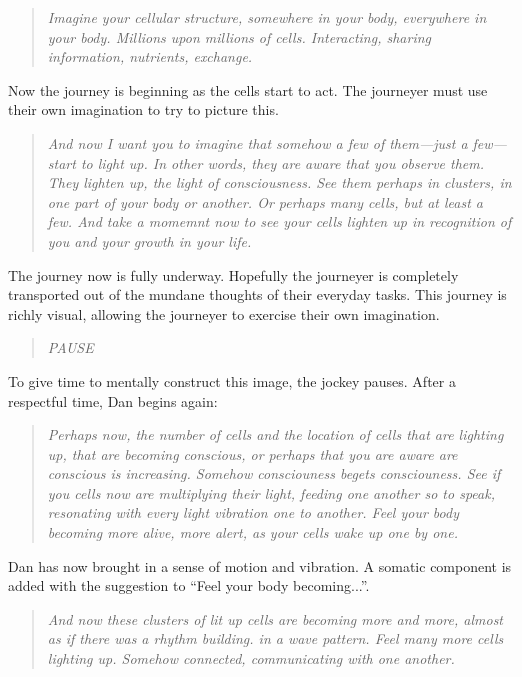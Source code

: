 \documentclass[12pt]{book}
\begin{document}
\begin{quote}{\em
Imagine your cellular structure, somewhere in your body, everywhere in your body.
Millions upon millions of cells. Interacting, sharing information, nutrients,
exchange.
}\end{quote}
Now the journey is beginning as the cells start to act. The journeyer
must use their own imagination to try to picture this.

\begin{quote}{\em
And now I want you to imagine that somehow a few of them---just a few---start to light up.
In other words, they are aware that you observe them.
They lighten up, the light of consciousness.
See them perhaps in clusters, in one part of your body or another.
Or perhaps many cells, but at least a few. And take a momemnt now
to see your cells lighten up in recognition of you and your growth in
your life.
}\end{quote}

The journey now is fully underway. Hopefully the journeyer is completely
transported out of the mundane thoughts of their everyday tasks. This
journey is richly visual, allowing the journeyer to exercise their
own imagination.

\begin{quote}{\em
  PAUSE
}\end{quote}

To give time to mentally construct this image, the jockey pauses.
After a respectful time, Dan begins again:

\begin{quote}{\em
Perhaps now, the number of cells and the location of cells that are lighting
up, that are becoming conscious, or perhaps that you are aware are conscious
is increasing. Somehow consciouness begets consciouness. See if you cells
now are multiplying their light, feeding one another so to speak, resonating
with every light vibration one to another. Feel your body becoming more
alive, more alert, as your cells wake up one by one.
}\end{quote}

Dan has now brought in a sense of motion and vibration. A somatic
component is added with the suggestion to ``Feel your body becoming...''.

\begin{quote}{\em
And now these clusters of lit up cells are becoming more and more, almost
as if there was a rhythm building.
in a wave pattern. Feel many more cells lighting up. Somehow connected,
communicating with one another.
}\end{quote}
\end{document}
